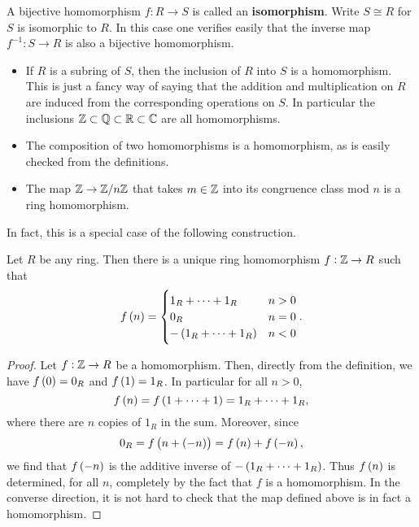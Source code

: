 \begin{definition}
A bijective homomorphism $ f : R \to S $ is called an \textbf{isomorphism}. Write $ S \cong R $ for $ S $ is isomorphic to $ R $. In this case one verifies easily that the inverse map $ f^{-1} : S \to R $ is also a bijective homomorphism.
\end{definition}

\begin{example*}
\hfill
\begin{itemize}
\item If $ R $ is a subring of $ S $, then the inclusion of $ R $ into $ S $ is a homomorphism. This is just a fancy way of saying that the addition and multiplication on $ R $ are induced from the corresponding operations on $ S $. In particular the inclusions $ \mathbb{Z} \subset \mathbb{Q} \subset \mathbb{R} \subset \mathbb{C} $ are all homomorphisms.
\item The composition of two homomorphisms is a homomorphism, as is easily checked from the definitions.
\item The map $ \mathbb{Z} \to \mathbb{Z} / n\mathbb{Z} $ that takes $ m \in \mathbb{Z} $ into its congruence class mod $ n $ is a ring homomorphism.
\end{itemize}
\end{example*}

In fact, this is a special case of the following construction.

\begin{proposition}
Let $ R $ be any ring. Then there is a unique ring homomorphism $ f : \mathbb{Z} \to R $ such that
$$ f\br{n} =
\begin{cases}
1_R + \dots + 1_R & n > 0 \\
0_R & n = 0 \\
-\br{1_R + \dots + 1_R} & n < 0
\end{cases}.
$$
\end{proposition}

\begin{proof}
Let $ f : \mathbb{Z} \to R $ be a homomorphism. Then, directly from the definition, we have $ f\br{0} = 0_R $ and $ f\br{1} = 1_R $. In particular for all $ n > 0 $,
$$ f\br{n} = f\br{1 + \dots + 1} = 1_R + \dots + 1_R, $$
where there are $ n $ copies of $ 1_R $ in the sum. Moreover, since
$$ 0_R = f\br{n + \br{-n}} = f\br{n} + f\br{-n}, $$
we find that $ f\br{-n} $ is the additive inverse of $ -\br{1_R + \dots + 1_R} $. Thus $ f\br{n} $ is determined, for all $ n $, completely by the fact that $ f $ is a homomorphism. In the converse direction, it is not hard to check that the map defined above is in fact a homomorphism.
\end{proof}


